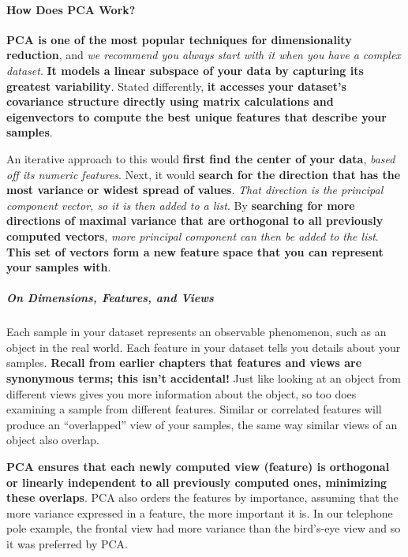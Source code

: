 \documentclass[11pt]{article}
\begin{document}
\paragraph{How Does PCA Work?}\label{how-does-pca-work}

\textbf{PCA is one of the most popular techniques for dimensionality
reduction}, and \emph{we recommend you always start with it when you
have a complex dataset}. \textbf{It models a linear subspace of your
data by capturing its greatest variability}. Stated differently,
\textbf{it accesses your dataset's covariance structure directly using
matrix calculations and eigenvectors to compute the best unique features
that describe your samples}.

An iterative approach to this would \textbf{first find the center of
your data}, \emph{based off its numeric features}. Next, it would
\textbf{search for the direction that has the most variance or widest
spread of values}. \emph{That direction is the principal component
vector, so it is then added to a list}. By \textbf{searching for more
directions of maximal variance that are orthogonal to all previously
computed vectors}, \emph{more principal component can then be added to
the list}. \textbf{This set of vectors form a new feature space that you
can represent your samples with}.

\subparagraph{On Dimensions, Features, and
Views}\label{on-dimensions-features-and-views}

Each sample in your dataset represents an observable phenomenon, such as
an object in the real world. Each feature in your dataset tells you
details about your samples. \textbf{Recall from earlier chapters that
features and views are synonymous terms; this isn't accidental!} Just
like looking at an object from different views gives you more
information about the object, so too does examining a sample from
different features. Similar or correlated features will produce an
``overlapped'' view of your samples, the same way similar views of an
object also overlap.

\textbf{PCA ensures that each newly computed view (feature) is
orthogonal or linearly independent to all previously computed ones,
minimizing these overlaps}. PCA also orders the features by importance,
assuming that the more variance expressed in a feature, the more
important it is. In our telephone pole example, the frontal view had
more variance than the bird's-eye view and so it was preferred by PCA.
\end{document}
